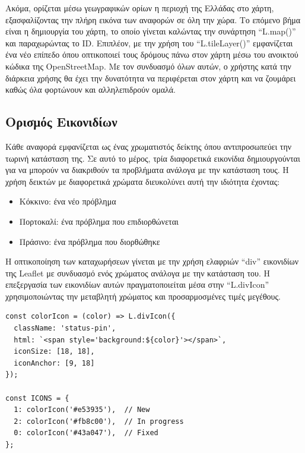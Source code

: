 Ακόμα, ορίζεται μέσω γεωγραφικών ορίων η περιοχή της Ελλάδας στο χάρτη, εξασφαλίζοντας την πλήρη εικόνα των αναφορών σε όλη την χώρα. Το επόμενο βήμα είναι η δημιουργία του χάρτη, το οποίο γίνεται καλώντας την συνάρτηση “L.map()” και παραχωρώντας το ID. Επιπλέον, με την χρήση του “L.tileLayer()” εμφανίζεται ένα νέο επίπεδο όπου οπτικοποιεί τους δρόμους πάνω στον χάρτη μέσω του ανοικτού κώδικα της OpenStreetMap. Με τον συνδυασμό όλων αυτών, ο χρήστης κατά την διάρκεια χρήσης θα έχει την δυνατότητα να περιφέρεται στον χάρτη και να ζουμάρει καθώς όλα φορτώνουν και αλληλεπιδρούν ομαλά.

\subsection{Ορισμός Εικονιδίων}
Κάθε αναφορά εμφανίζεται ως ένας χρωματιστός δείκτης όπου αντιπροσωπεύει την τωρινή κατάσταση της. Σε αυτό το μέρος, τρία διαφορετικά εικονίδια δημιουργούνται για να μπορούν να διακριθούν τα προβλήματα ανάλογα με την κατάσταση τους. Η χρήση δεικτών με διαφορετικά χρώματα διευκολύνει αυτή την ιδιότητα έχοντας:
\begin{itemize}
  \item Κόκκινο: ένα νέο πρόβλημα
  \item Πορτοκαλί: ένα πρόβλημα που επιδιορθώνεται
  \item Πράσινο: ένα πρόβλημα που διορθώθηκε
\end{itemize}

Η οπτικοποίηση των καταχωρήσεων γίνεται με την χρήση ελαφριών “div” εικονιδίων της Leaflet με συνδυασμό ενός χρώματος ανάλογα με την κατάσταση του. Η επεξεργασία των εικονιδίων αυτών πραγματοποιείται μέσα στην “L.divIcon” χρησιμοποιώντας την μεταβλητή χρώματος και προσαρμοσμένες τιμές μεγέθους.
\\

\begin{lstlisting}
const colorIcon = (color) => L.divIcon({
  className: 'status-pin',
  html: `<span style='background:${color}'></span>`,
  iconSize: [18, 18],
  iconAnchor: [9, 18]
});

const ICONS = {
  1: colorIcon('#e53935'),  // New
  2: colorIcon('#fb8c00'),  // In progress
  0: colorIcon('#43a047'),  // Fixed
};

\end{lstlisting}

